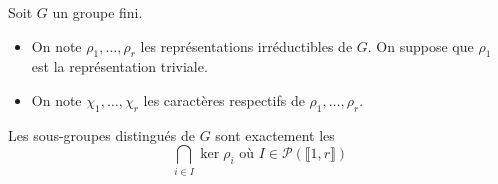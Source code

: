



	
	
	Soit $G$ un groupe fini.
	
	\begin{notation}
		\begin{itemize}
			\item On note $\rho_1, \dots, \rho_r$ les représentations irréductibles de $G$. On suppose que $\rho_1$ est la représentation triviale.
			\item On note $\chi_1, \dots, \chi_r$ les caractères respectifs de $\rho_1, \dots, \rho_r$.
		\end{itemize}
	\end{notation}
	
	\begin{theorem}
		\label{sous-groupes-distingues-et-table-des-caracteres-1}
		Les sous-groupes distingués de $G$ sont exactement les
		\[ \bigcap_{i \in I} \ker{\rho_i} \text{ où } I \in \mathcal{P}(\llbracket 1, r \rrbracket) \]
	\end{theorem}

